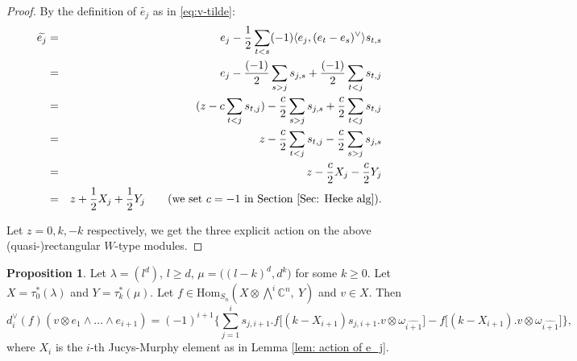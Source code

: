 \documentclass[11pt]{amsart}
\numberwithin{equation}{section}
\theoremstyle{definition}
\newtheorem{proposition}[thm]{Proposition}
\renewcommand{\tilde}{\widetilde}
\begin{document}
\begin{proof}
By the definition of $\tilde{e_{j}}$ as in \eqref{eq:v-tilde}:
    \begin{eqnarray*}
        \widetilde{e_{j}}
        &=&e_{j}-\frac{1}{2}\sum_{t<s}(-1)\langle e_{j},(e_{t}-e_{s})^{\vee}\rangle s_{t,s}\\
        &=&e_{j}-\frac{(-1)}{2}\sum_{s>j}s_{j,s}+\frac{(-1)}{2}\sum_{t<j}s_{t,j}\\
        &=&(z-c\sum_{t<j}s_{t,j})-\frac{c}{2}\sum_{s>j}s_{j,s}+\frac{c}{2}\sum_{t<j}s_{t,j}\\
        &=&z-\frac{c}{2}\sum_{t<j}s_{t,j}-\frac{c}{2}\sum_{s>j}s_{j,s}\\
        &=&z-\frac{c}{2}X_{j}-\frac{c}{2}Y_{j}\\
        &=&z+\frac{1}{2}X_{j}+\frac{1}{2}Y_{j}\qquad (\textnormal{we set $c=-1$ in Section \ref{Sec: Hecke alg}}).
    \end{eqnarray*}
    
Let $z=0,k,-k$ respectively, we get the three explicit action on the above (quasi-)rectangular \(W\)-type modules.
\end{proof}







\begin{proposition}\label{prop: computation of d_i}
Let $\lambda=(l^{d})$, $l\geq d$, $\mu=\big((l-k)^{d},d^{k}\big)$ for some $k\geq0$. Let $X=\tau_{0}^{*}(\lambda)$ and $Y=\tau_{k}^{*}(\mu)$. Let 
$f\in\text{Hom}_{S_{n}}(X\otimes\bigwedge^{i}\mathbb{C}^{n},\ Y)$ and $v\in X$. Then
\begin{equation}\label{d_i(f)}
    d_{i}^{\vee}(f)(v\otimes e_{1}\wedge...\wedge e_{i+1})=
    (-1)^{i+1}\Bigg\{\sum_{j=1}^{i} s_{j,i+1}.f\big[(k-X_{i+1})s_{j,i+1}.v\otimes\omega_{\hat{i+1}} \big]-f\big[(k-X_{i+1}).v\otimes\omega_{\hat{i+1}}\big]\Bigg\},
\end{equation}
where $X_{i}$ is the $i$-th Jucys-Murphy element as in Lemma \ref{lem: action of e_j}.
\end{proposition}
\end{document}

